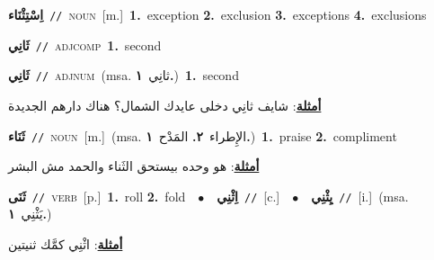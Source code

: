\documentclass[10pt,a4paper,twoside]{article} %
\begin{document}
\begin{multicols}{2}
{\setlength\topsep{0pt}\textbf{\foreignlanguage{arabic}{اِسْتِثْنَاء}}\ {\color{gray}\texttt{//}\color{black}}\ \textsc{noun}\ [m.]\ \textbf{1.}~exception  \textbf{2.}~exclusion  \textbf{3.}~exceptions  \textbf{4.}~exclusions\ } \vspace{2mm}

{\setlength\topsep{0pt}\textbf{\foreignlanguage{arabic}{ثَانِي}}\ {\color{gray}\texttt{//}\color{black}}\ \textsc{adj\textunderscore comp}\ \textbf{1.}~second\ } \vspace{2mm}

{\setlength\topsep{0pt}\textbf{\foreignlanguage{arabic}{ثَانِي}}\ {\color{gray}\texttt{//}\color{black}}\ \textsc{adj\textunderscore num}\ \color{gray}(msa. \foreignlanguage{arabic}{ثانِي}~\foreignlanguage{arabic}{\textbf{١.}})\color{black}\ \textbf{1.}~second\  \begin{flushright}\color{gray}\foreignlanguage{arabic}{\textbf{\underline{\foreignlanguage{arabic}{أمثلة}}}: شايف ثانِي دخلى عايدك الشمال؟ هناك دارهم الجديدة}\end{flushright}\color{black}} \vspace{2mm}

{\setlength\topsep{0pt}\textbf{\foreignlanguage{arabic}{ثَنَاء}}\ {\color{gray}\texttt{//}\color{black}}\ \textsc{noun}\ [m.]\ \color{gray}(msa. \foreignlanguage{arabic}{الإِطراء}~\foreignlanguage{arabic}{\textbf{٢.}}  \foreignlanguage{arabic}{المَدْح}~\foreignlanguage{arabic}{\textbf{١.}})\color{black}\ \textbf{1.}~praise  \textbf{2.}~compliment\  \begin{flushright}\color{gray}\foreignlanguage{arabic}{\textbf{\underline{\foreignlanguage{arabic}{أمثلة}}}: هو وحده بيستحق الثَناء والحمد مش البشر}\end{flushright}\color{black}} \vspace{2mm}

{\setlength\topsep{0pt}\textbf{\foreignlanguage{arabic}{ثَنَى}}\ {\color{gray}\texttt{//}\color{black}}\ \textsc{verb}\ [p.]\ \textbf{1.}~roll  \textbf{2.}~fold\ \ $\bullet$\ \ \setlength\topsep{0pt}\textbf{\foreignlanguage{arabic}{اِثْنِي}}\ {\color{gray}\texttt{//}\color{black}}\ [c.]\ \ $\bullet$\ \ \setlength\topsep{0pt}\textbf{\foreignlanguage{arabic}{يِثْنِي}}\ {\color{gray}\texttt{//}\color{black}}\ [i.]\ \color{gray}(msa. \foreignlanguage{arabic}{يَثْنِي}~\foreignlanguage{arabic}{\textbf{١.}})\color{black}\  \begin{flushright}\color{gray}\foreignlanguage{arabic}{\textbf{\underline{\foreignlanguage{arabic}{أمثلة}}}: اثْنِي كمَّك ثنيتين}\end{flushright}\color{black}} \vspace{2mm}


\end{multicols}
\end{document}
